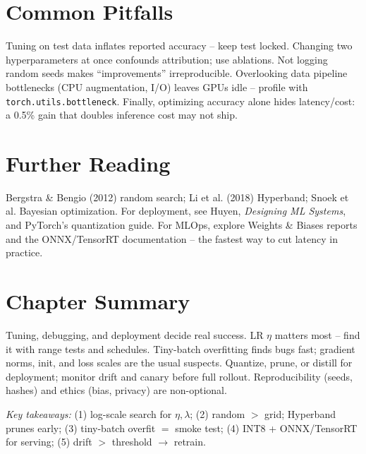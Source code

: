 \section{Common Pitfalls}
Tuning on test data inflates reported accuracy -- keep test locked. Changing
two hyperparameters at once confounds attribution; use ablations. Not logging
random seeds makes ``improvements'' irreproducible. Overlooking data pipeline
bottlenecks (CPU augmentation, I/O) leaves GPUs idle -- profile with
\texttt{torch.utils.bottleneck}. Finally, optimizing accuracy alone hides
latency/cost: a 0.5\% gain that doubles inference cost may not ship.

\section{Further Reading}
Bergstra \& Bengio (2012) random search; Li et al. (2018) Hyperband; Snoek et
al. Bayesian optimization. For deployment, see Huyen, \emph{Designing ML
Systems}, and PyTorch's quantization guide. For MLOps, explore Weights \&
Biases reports and the ONNX/TensorRT documentation -- the fastest way to cut
latency in practice.

\section{Chapter Summary}
Tuning, debugging, and deployment decide real success. LR $\eta$ matters most
-- find it with range tests and schedules. Tiny-batch overfitting finds bugs
fast; gradient norms, init, and loss scales are the usual suspects. Quantize,
prune, or distill for deployment; monitor drift and canary before full rollout.
Reproducibility (seeds, hashes) and ethics (bias, privacy) are non-optional.

\smallskip
\noindent\textit{Key takeaways:} (1) log-scale search for $\eta,\lambda$;
(2) random $>$ grid; Hyperband prunes early; (3) tiny-batch overfit $=$
smoke test; (4) INT8 + ONNX/TensorRT for serving; (5) drift $>$ threshold
$\to$ retrain.

